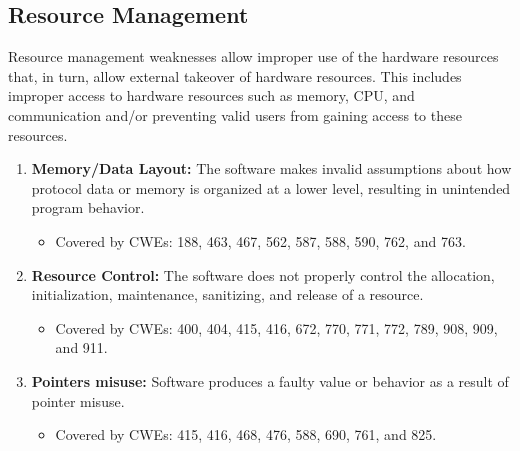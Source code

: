 \documentclass{article}
\begin{document}
\subsection{Resource Management}
Resource management weaknesses allow improper use of the hardware resources that, in turn, allow external takeover of hardware resources. This includes improper access to hardware resources such as memory, CPU, and communication and/or preventing valid users from gaining access to these resources.
\begin{enumerate}
    \item \textbf{Memory/Data Layout:} The software makes invalid assumptions about how protocol data or memory is organized at a lower level, resulting in unintended program behavior.
    \begin{itemize}
        \item Covered by CWEs: 188, 463, 467, 562, 587, 588, 590, 762, and 763.
    \end{itemize}
    
    \item \textbf{Resource Control:} The software does not properly control the allocation, initialization, maintenance, sanitizing, and release of a resource.
    \begin{itemize}
        \item Covered by CWEs: 400, 404, 415, 416, 672, 770, 771, 772, 789, 908, 909, and 911.
    \end{itemize}
    
    \item \textbf{Pointers misuse:} Software produces a faulty value or behavior as a result of pointer misuse. 
    \begin{itemize}
        \item Covered by CWEs: 415, 416, 468, 476, 588, 690, 761, and 825. 
    \end{itemize}
\end{enumerate}    
\end{document}
